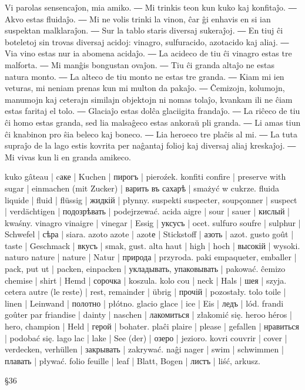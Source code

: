 Vi parolas sensencaĵon, mia amiko. ― Mi trinkis teon kun kuko kaj konfitaĵo. ― Akvo estas fluidaĵo. ― Mi ne volis trinki la vinon, ĉar ĝi enhavis en si ian suspektan malklaraĵon. ― Sur la tablo staris diversaj sukeraĵoj. ― En tiuj ĉi boteletoj sin trovas diversaj acidoj: vinagro, sulfuracido, azotacido kaj aliaj. ― Via vino estas nur ia abomena acidaĵo. ― La acideco de tiu ĉi vinagro estas tre malforta. ― Mi manĝis bongustan ovaĵon. ― Tiu ĉi granda altaĵo ne estas natura monto. ― La alteco de tiu monto ne estas tre granda. ― Kiam mi ien veturas, mi neniam prenas kun mi multon da pakaĵo. ― Ĉemizojn, kolumojn, manumojn kaj ceterajn similajn objektojn ni nomas tolaĵo, kvankam ili ne ĉiam estas faritaj el tolo. ― Glaciaĵo estas dolĉa glaciigita frandaĵo. ― La riĉeco de tiu ĉi homo estas granda, sed lia malsaĝeco estas ankoraŭ pli granda. ― Li amas tiun ĉi knabinon pro ŝia beleco kaj boneco. ― Lia heroeco tre plaĉis al mi. ― La tuta supraĵo de la lago estis kovrita per naĝantaj folioj kaj diversaj aliaj kreskaĵoj. ― Mi vivas kun li en granda amikeco.

kuko gâteau | cаке | Kuchen | пирогъ | pieroźek.
konfiti confire | preserve with sugar | einmachen (mit Zucker) | варить въ сахарѣ | smażyć w cukrze.
fluida liquide | fluid | flüssig | жидкій | płynny.
suspekti suspecter, soupçonner | suspect | verdächtigen | подозрѣвать | podejrzewać.
acida aigre | sour | sauer | кислый | kwaśny.
vinagro vinaigre | vinegar | Essig | уксусъ | ocet.
sulfuro soufre | sulphur | Schwefel | сѣра | siara.
azoto azote | azotе | Stickstoff | азоть | azot.
gusto goût | taste | Geschmack | вкусъ | smak, gust.
alta haut | high | hoch | высокій | wysoki.
naturo nature | nature | Natur | природа | przyroda.
paki empaqueter, emballer | pack, put ut | packen, einpacken | укладывать, упаковывать | pakować.
ĉemizo chemise | shirt | Hemd | сорочка | koszula.
kolo cou | neck | Hals | шея | szyja.
cetera autre (le reste) | rest, remainder | übrig | прочій | pozostały.
tolo toile | linen | Leinwand | полотно | płótno.
glacio glace | ice | Eis | ледъ | lód.
frandi goûter par friandise | dainty | naschen | лакомиться | złakomić się.
heroo héros | hero, champion | Held | герой | bohater.
plaĉi plaire | please | gefallen | нравиться | podobać się.
lago lac | lake | See (der) | озеро | jezioro.
kovri couvrir | cover | verdecken, verhüllen | закрывать | zakrywać.
naĝi nager | swim | schwimmen | плавать | pływać.
folio feuille | leaf | Blatt, Bogen | листъ | liść, arkusz.

§36


